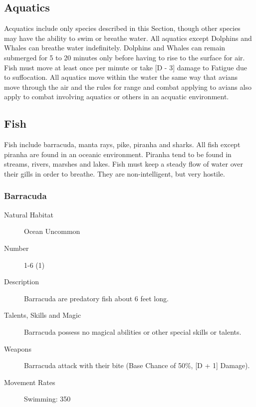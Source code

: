 \begin{multicols*}{2}

\setlength\columnseprule{0.2mm}

\section{Aquatics}
Acquatics include only species described in this Section, though other
species may have the ability to swim or breathe water. All aquatics
except Dolphins and Whales can breathe water indefinitely.  Dolphins
and Whales can remain submerged for 5 to 20 minutes only before having
to rise to the surface for air.  Fish must move at least once per
minute or take [D - 3] damage to Fatigue due to suffocation.  All
aquatics move within the water the same way that avians move through
the air and the rules for range and combat applying to avians also
apply to combat involving aquatics or others in an acquatic
environment.

\subsection{Fish}
Fish include barracuda, manta rays, pike, piranha and sharks. All fish
except piranha are found in an oceanic environment.  Piranha tend to
be found in streams, rivers, marshes and lakes. Fish must keep a
steady flow of water over their gills in order to breathe. They are
non-intelligent, but very hostile.

\subsubsection{Barracuda}

\begin{description}
\item[Natural Habitat] Ocean Uncommon

\item[Number] 1-6 (1)

\item[Description] Barracuda are predatory fish about 6 feet long.

\item[Talents, Skills and Magic] Barracuda possess no magical abilities or other special
skills or talents.

\item[Weapons] Barracuda attack with their bite (Base Chance of 50\%,
[D + 1] Damage).

\item[Movement Rates] Swimming: 350


\end{description}
\end{multicols*}
